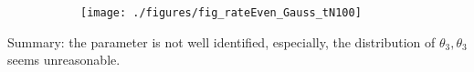\documentclass[12pt]{article}
\begin{document}
\begin{figure}[h!]
   \caption{Update rate}\label{fig:traj} \vspace{-2mm}
    \centering
    \hspace{-20mm}
    \begin{subfigure}[b]{0.45\textwidth}       %
        \texttt{[image: ./figures/fig\_rateEven\_Gauss\_tN100]} %
        \label{fig:gull}
    \end{subfigure}
\end{figure}

Summary: the parameter is not well identified, especially, the distribution of $\theta_3, \theta_3$ seems unreasonable.  

% 
%

\bigskip
\end{document}
